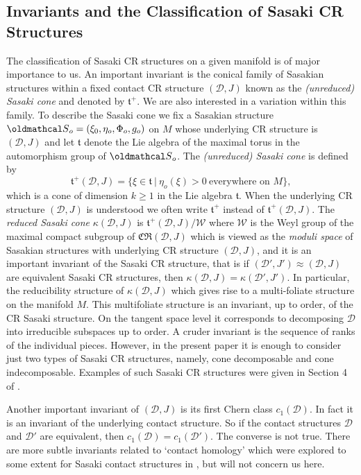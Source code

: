 \documentclass[12pt]{amsart}
\def\grk{\kappa}
\def\cald{{\mathcal D}}
\def\cals{{\oldmathcal S}}
\def\calw{{\mathcal W}}
\def\gt{{\mathfrak t}}
\def\gC{{\mathfrak C}}
\def\gR{{\mathfrak R}}
\begin{document}
\subsection{Invariants and the Classification of Sasaki CR Structures}
The classification of Sasaki CR structures on a given manifold is of major importance to us. An important invariant is the conical family of Sasakian structures within a fixed contact CR structure $(\cald,J)$ known as the {\it (unreduced) Sasaki cone} and denoted by $\gt^+$. We are also interested in a variation within this family. To describe the Sasaki cone we fix a Sasakian structure $\cals_o=(\xi_0,\eta_o,\Phi_o,g_o)$ on $M$ whose underlying CR structure is $(\cald,J)$ and let $\gt$ denote the Lie algebra of the maximal torus in the automorphism group of $\cals_o$. The {\it (unreduced) Sasaki cone} \cite{BGS06} is defined by
\begin{equation}\label{sascone}
\gt^+(\cald,J)=\{\xi\in\gt~|~\eta_o(\xi)>0~\text{everywhere on $M$}\},
\end{equation}
which is a cone of dimension $k\geq 1$ in the Lie algebra $\gt$. When the underlying CR structure $(\cald,J)$ is understood we often write $\gt^+$ instead of $\gt^+(\cald,J)$. The {\it reduced Sasaki cone} $\grk(\cald,J)$ is $\gt^+(\cald,J)/\calw$ where $\calw$ is the Weyl group of the maximal compact subgroup of $\gC\gR(\cald,J)$ which is viewed as the {\it moduli space} of Sasakian structures with underlying CR structure $(\cald,J)$, and it is an important invariant of the Sasaki CR structure, that is if $(\cald',J')\approx(\cald,J)$ are equivalent Sasaki CR structures, then $\grk(\cald,J)=\grk(\cald',J')$. In particular, the reducibility structure \cite{BHLT16} of $\grk(\cald,J)$ which gives rise to a multi-foliate structure on the manifold $M$. This multifoliate structure is an invariant, up to order, of the CR Sasaki structure. On the tangent space level it corresponds to decomposing $\cald$ into irreducible subspaces up to order. A cruder invariant is the sequence of ranks of the individual pieces. However, in the present paper it is enough to consider just two types of Sasaki CR structures, namely, cone decomposable and cone indecomposable. Examples of such Sasaki CR structures were given in Section 4 of \cite{BHLT16}. 

Another important invariant of $(\cald,J)$ is its first Chern class $c_1(\cald)$. In fact it is an invariant of the underlying contact structure. So if the contact structures $\cald$ and $\cald'$ are equivalent, then $c_1(\cald)=c_1(\cald')$. The converse is not true. There are more subtle invariants related to `contact homology' which were explored to some extent for Sasaki contact structures in \cite{BoPa10,BMvK15}, but will not concern us here.
\end{document}

